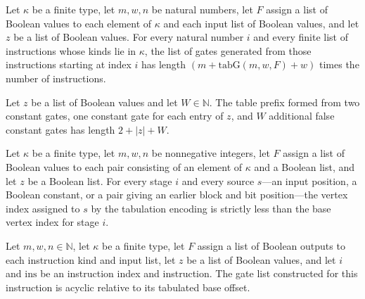 \begin{theorem}
\label{BoolCircuit.length_tabProgGates}
\leanok
{}
Let $\kappa$ be a finite type, let $m,w,n$ be natural numbers, let $F$ assign a list of
Boolean values to each element of $\kappa$ and each input list of Boolean values, and
let $z$ be a list of Boolean values. For every natural number $i$ and every finite list
of instructions whose kinds lie in $\kappa$, the list of gates generated from those
instructions starting at index $i$ has length $(m+\mathrm{tabG}(m,w,F)+w)$ times the
number of instructions.
\end{theorem}

\begin{theorem}
\label{BoolCircuit.length_tabPre}
\leanok
{}
Let $z$ be a list of Boolean values and let $W\in\mathbb{N}$. The table prefix formed
from two constant gates, one constant gate for each entry of $z$, and $W$ additional
false constant gates has length $2+|z|+W$.
\end{theorem}

\begin{theorem}
\label{BoolCircuit.tabSrc_lt}
\leanok
{}
Let $\kappa$ be a finite type, let $m,w,n$ be nonnegative integers, let $F$ assign a
list of Boolean values to each pair consisting of an element of $\kappa$ and a Boolean
list, and let $z$ be a Boolean list. For every stage $i$ and every source $s$—an input
position, a Boolean constant, or a pair giving an earlier block and bit position—the
vertex index assigned to $s$ by the tabulation encoding is strictly less than the base
vertex index for stage $i$.
\end{theorem}

\begin{theorem}
\label{BoolCircuit.gatesAcyclic_tabInstrGates}
\leanok
{}
Let $m,w,n\in\mathbb{N}$, let $\kappa$ be a finite type, let $F$ assign a list of
Boolean outputs to each instruction kind and input list, let $z$ be a list of Boolean
values, and let $i$ and $\mathrm{ins}$ be an instruction index and instruction. The gate
list constructed for this instruction is acyclic relative to its tabulated base offset.
\end{theorem}

